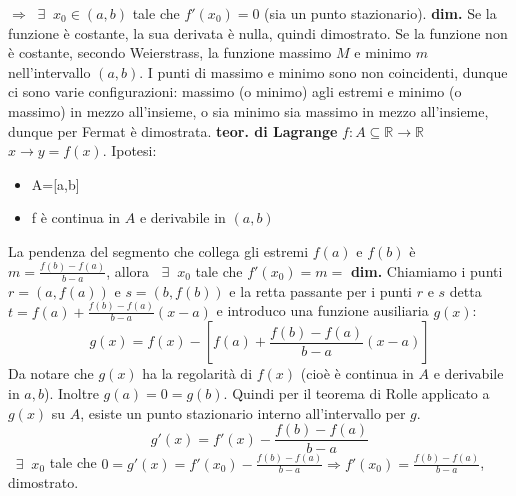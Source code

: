 $\Longrightarrow \;\; \exists \;\; x_0 \in(a,b) $ tale che $f'(x_0) = 0$ (sia un punto stazionario).\newline
\textbf{dim.} Se la funzione è costante, la sua derivata è nulla, quindi dimostrato. Se la funzione non è costante, secondo Weierstrass, la funzione massimo $M$ e minimo $m$ nell'intervallo $(a,b)$. I punti di massimo e minimo sono non coincidenti, dunque ci sono varie configurazioni: massimo (o minimo) agli estremi e minimo (o massimo) in mezzo all'insieme, o sia minimo sia massimo in mezzo all'insieme, dunque per Fermat è dimostrata.\newline
\newline
\newline
\textbf{teor. di Lagrange} \newline
$f: A \subseteq \mathbb{R} \rightarrow  \mathbb{R}$\newline
$x \rightarrow  y = f(x)$.\newline
Ipotesi:
\begin{itemize}
    \item A=[a,b]
    \item f è continua in $A$ e derivabile in $(a,b)$
\end{itemize}
La pendenza del segmento che collega gli estremi $f(a)$ e $f(b)$ è $m = \frac{f(b)-f(a)}{b-a}$, allora $\;\; \exists \;\; x_0$ tale che $f'(x_0) = m = $\newline
\textbf{dim.} \newline
Chiamiamo i punti $r = (a,f(a))$ e $s = (b,f(b))$ e la retta passante per i punti $r$ e $s$ detta $t = f(a)+\frac{f(b)-f(a)}{b-a}(x-a)$ e introduco una funzione ausiliaria $g(x)$:
\[
    g(x) = f(x) - [f(a)+\frac{f(b)-f(a)}{b-a}(x-a)]
\]
Da notare che $g(x)$ ha la regolarità di $f(x)$ (cioè è continua in $A$ e derivabile in $a,b$).\newline
Inoltre $g(a) = 0 = g(b)$.\newline
Quindi per il teorema di Rolle applicato a $g(x)$ su $A$, esiste un punto stazionario interno all'intervallo per $g$.
\[
    g'(x) = f'(x) - \frac{f(b)-f(a)}{b-a}
\]
$\;\;\exists\;\; x_0$ tale che $0 = g'(x) = f'(x_0) -\frac{f(b)-f(a)}{b-a} \Longrightarrow f'(x_0) = \frac{f(b)-f(a)}{b-a} $, dimostrato.\newline
\newline
\newline
